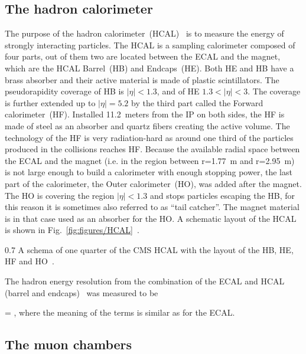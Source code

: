 \subsection{The hadron calorimeter}

The purpose of the hadron calorimeter~(HCAL)~\cite{tdrHCAL} is to measure the energy of strongly interacting particles.  The HCAL is a sampling calorimeter composed of four parts, out of them two are located between the ECAL and the magnet, which are the HCAL Barrel~(HB) and Endcaps~(HE). Both HE and HB have a brass absorber and their active material is made of plastic scintillators. The pseudorapidity coverage of HB is $|\eta|<1.3$, and of HE $1.3<|\eta|<3$. The coverage is further extended up to $|\eta|=5.2$ by the third part called the Forward calorimeter~(HF). Installed 11.2~meters from the IP on both sides, the HF is made of steel as an absorber and quartz fibers creating the active volume. The technology of the HF is very radiation-hard as around one third of the particles produced in the collisions reaches HF. Because the available radial space between the ECAL and the magnet (i.e. in the region between r=1.77~m and r=2.95~m) is not large enough to build a calorimeter with enough stopping power, the last part of the calorimeter, the Outer calorimeter~(HO), was added after the magnet. The HO is covering the region $|\eta|<1.3$ and stops particles escaping the HB, for this reason it is sometimes also referred to as ``tail catcher''. The magnet material is in that case used as an absorber for the HO. A schematic layout of the HCAL is shown in Fig.~\ref{fig:figures/HCAL}~\cite{Chatrchyan:2008aa}.

                 {0.7}       
                 {A schema of one quarter of the CMS HCAL with the layout of the HB, HE, HF and HO~\cite{Chatrchyan:2008aa}. }

The hadron energy resolution from the combination of the ECAL and HCAL (barrel and endcaps)~\cite{Chatrchyan:2009ag} was measured to be


{
  =   ,
}
where the meaning of the terms is similar as for the ECAL.

\subsection{The muon chambers}

